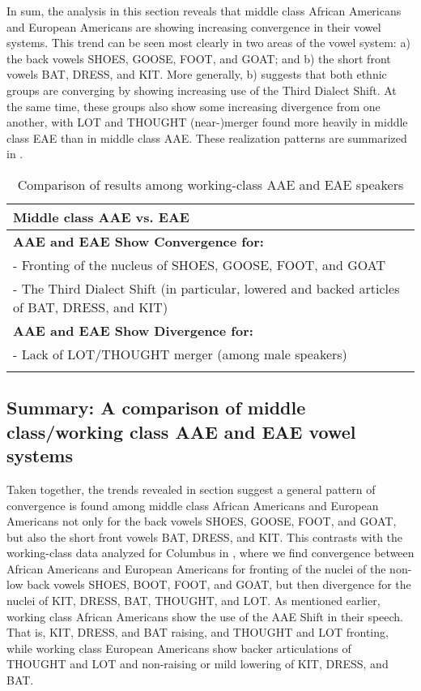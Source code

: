 \documentclass[output=paper,colorlinks,citecolor=brown]{langscibook}
\begin{document}
In sum, the analysis in this section reveals that middle class African Americans and European Americans are showing increasing convergence in their vowel systems. This trend can be seen most clearly in two areas of the vowel system: a) the back vowels SHOES, GOOSE, FOOT, and GOAT; and b) the short front vowels BAT, DRESS, and KIT. More generally, b) suggests that both ethnic groups are converging by showing increasing use of the Third Dialect Shift. At the same time, these groups also show some increasing divergence from one another, with LOT and THOUGHT (near-)merger found more heavily in middle class EAE than in middle class AAE.  These realization patterns are summarized in .

\begin{table}
\begin{tabularx}{\textwidth}{X}
\lsptoprule
\textbf{Middle class AAE vs. EAE}\\
\midrule
{\textbf{AAE and EAE Show Convergence for:}}\\
- Fronting of the nucleus of SHOES, GOOSE, FOOT, and GOAT\\
\tablevspace
- The Third Dialect Shift (in particular, lowered and backed articles of BAT, DRESS, and KIT)\\
\tablevspace
\midrule
{\textbf{AAE and EAE Show Divergence for:}}\\
- Lack of LOT/THOUGHT merger (among male speakers)\\
\lspbottomrule
\end{tabularx}
\caption{Comparison of results among working-class AAE and EAE speakers}
\label{tab:durian:3}
\end{table}



\subsection{Summary: A comparison of middle class\slash working class AAE and EAE vowel systems} \label{sec:durian:4.3}

Taken together, the trends revealed in section  suggest a general pattern of convergence is found among middle class African Americans and European Americans not only for the back vowels SHOES, GOOSE, FOOT, and GOAT, but also the short front vowels BAT, DRESS, and KIT. This contrasts with the working-class data analyzed for Columbus in  \citet{Durianschumacher2010}, where we find convergence between African Americans and European Americans for fronting of the nuclei of the non-low back vowels SHOES, BOOT, FOOT, and GOAT, but then divergence for the nuclei of KIT, DRESS, BAT, THOUGHT, and LOT. As mentioned earlier, working class African Americans show the use of the AAE Shift in their speech. That is, KIT, DRESS, and BAT raising, and THOUGHT and LOT fronting, while working class European Americans show backer articulations of THOUGHT and LOT and non-raising or mild lowering of KIT, DRESS, and BAT.
\end{document}
